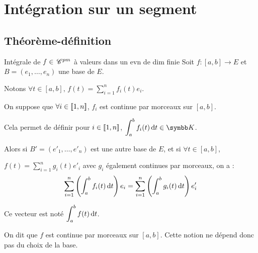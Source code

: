 \section{Intégration sur un segment}
\subsection{Théorème-définition}

\begin{theoreme}{Intégrale de $f \in \,\mathscr C^{pm}$ à valeurs dans un evn de dim finie}{}
    Soit $f : [a, b] \to E$ et $B = (e_1, \ldots, e_n)$ une base de $E$.

    Notons $\displaystyle \forall t \in [a, b], \, f(t) = \sum_{i=1}^n f_i(t)e_i$.

    On suppose que $\forall i \in [\![1, n]\!]$, $f_i$ est continue par morceaux sur $[a, b]$.

    Cela permet de définir pour $i \in [\![1, n]\!] $, $\displaystyle \int_a^b f_i(t) \dt \in \K$.

    Alors si $B' = (e'_1, \ldots, e'_n)$ est une autre base de $E$, et si 
    $\displaystyle \forall t \in [a, b]$,  
    
    $\displaystyle f(t) = \sum_{i=1}^n g_i(t)e'_i$ avec 
    $g_i$ également continues par morceaux, on a :
    \[\sum_{i=1}^n \left( \int_a^b f_i(t) \,\mathrm{d}t \right) e_i = \sum_{i=1}^n \left( \int_a^b g_i(t) \,\mathrm{d}t \right) e'_i\]

    Ce vecteur est noté $\displaystyle \int_a^b f(t) \,\mathrm{d}t$.

    On dit que $f$ est continue par morceaux sur $[a, b]$. Cette notion ne dépend donc pas 
    du choix de la base.
\end{theoreme}


